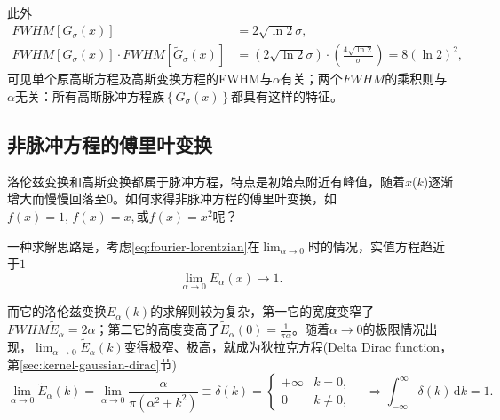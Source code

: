 此外
\begin{equation}
    \label{eq:fourier-gaussian-fwhm-product}
  \begin{split}
    FWHM \left[ G_{\sigma} \left( x \right) \right]
    & = 2 \sqrt{ \ln 2} \sigma, \\
    FWHM \left[ G_{\sigma} \left( x \right) \right] \cdot FWHM \left[ \widetilde{G}_{\sigma} \left( x \right) \right]
    & = \left( 2 \sqrt{\ln 2} \sigma \right) \cdot
    \left( \frac{4 \sqrt{\ln 2}}{\sigma}\right) = 8 \left( \ln 2\right)^{2},
  \end{split}
\end{equation}
可见单个原高斯方程及高斯变换方程的FWHM与$\alpha$有关；两个$FWHM$的乘积则与$\alpha$无关：所有高斯脉冲方程族$\left\{ G_{\sigma}(x) \right\}$都具有这样的特征。

\subsection{非脉冲方程的傅里叶变换}
\label{sec:fourier-non-pulse-functions}
洛伦兹变换和高斯变换都属于脉冲方程，特点是初始点附近有峰值，随着$x$($k$)逐渐增大而慢慢回落至$0$。如何求得非脉冲方程的傅里叶变换，如$f(x) = 1, \, f(x)=x, $或$f(x) = x^{2}$呢？

一种求解思路是，考虑\eqref{eq:fourier-lorentzian}在$\lim_{\alpha \rightarrow 0}$时的情况，实值方程趋近于$1$
\begin{equation*}
  \lim_{\alpha \rightarrow 0} E_{\alpha}(x) \rightarrow 1.
\end{equation*}

而它的洛伦兹变换$\widetilde{E}_{\alpha}(k)$的求解则较为复杂，第一它的宽度变窄了$FWHM \widetilde{E}_{\alpha} = 2 \alpha$；第二它的高度变高了$\widetilde{E}_{\alpha} \left( 0 \right) = \frac{1}{\pi \alpha}$。随着$\alpha \rightarrow 0$的极限情况出现，$\lim_{\alpha \rightarrow 0} \widetilde{E}_{\alpha}(k)$变得极窄、极高，就成为狄拉克方程(Delta Dirac function， 第\ref{sec:kernel-gaussian-dirac}节) 
\begin{equation}
  \label{eq:fourier-non-pulse-dirac}
  \lim_{\alpha \rightarrow 0} \widetilde{E}_{\alpha}(k) = \lim_{\alpha \rightarrow 0} \frac{
  \alpha
  }{\pi \left( \alpha^{2} + k^{2} \right)}
  \equiv \delta (k) = \begin{cases}
  + \infty & k = 0, \\
  0 & k \neq 0,
\end{cases} \quad \Rightarrow \int_{- \infty}^{\infty} \delta (k) \, \mathrm{d} k = 1.
\end{equation}

